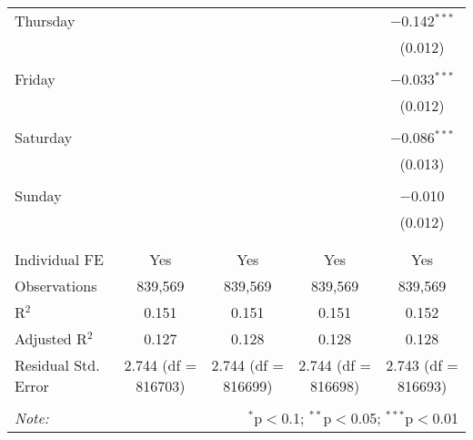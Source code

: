 \documentclass[
]{article}
\begin{document}
\begin{table}[!htbp]
{\begin{tabular}{@{\extracolsep{5pt}}lcccc}
 Thursday &  &  &  & $-$0.142$^{***}$ \\ 
  &  &  &  & (0.012) \\ 
  & & & & \\ 
 Friday &  &  &  & $-$0.033$^{***}$ \\ 
  &  &  &  & (0.012) \\ 
  & & & & \\ 
 Saturday &  &  &  & $-$0.086$^{***}$ \\ 
  &  &  &  & (0.013) \\ 
  & & & & \\ 
 Sunday &  &  &  & $-$0.010 \\ 
  &  &  &  & (0.012) \\ 
  & & & & \\ 
\hline \\[-1.8ex] 
Individual FE & Yes & Yes & Yes & Yes \\ 
Observations & 839,569 & 839,569 & 839,569 & 839,569 \\ 
R$^{2}$ & 0.151 & 0.151 & 0.151 & 0.152 \\ 
Adjusted R$^{2}$ & 0.127 & 0.128 & 0.128 & 0.128 \\ 
Residual Std. Error & 2.744 (df = 816703) & 2.744 (df = 816699) & 2.744 (df = 816698) & 2.743 (df = 816693) \\ 
\hline 
\hline \\[-1.8ex] 
\textit{Note:}  & \multicolumn{4}{r}{$^{*}$p$<$0.1; $^{**}$p$<$0.05; $^{***}$p$<$0.01} \\ 
\end{tabular}
} 
\end{table} 
\newpage
\end{document}
